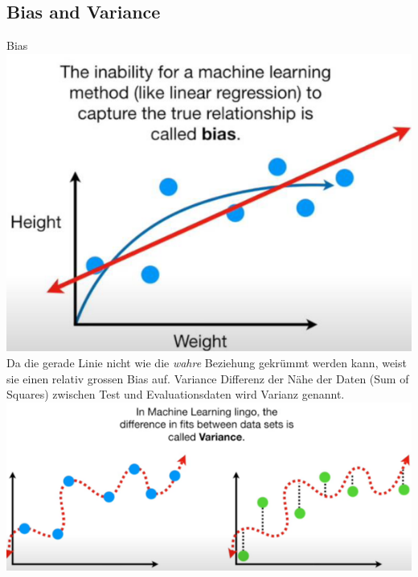 \subsection{Bias and Variance}
\textcolor{myblue}{Bias}\\
\includegraphics[width=\linewidth]{img/bias.png}
Da die gerade Linie nicht wie die \textit{wahre} Beziehung gekrümmt werden kann, weist sie einen relativ grossen Bias auf.
\textcolor{myblue}{Variance}
Differenz der Nähe der Daten (Sum of Squares) zwischen Test und Evaluationsdaten wird Varianz genannt.
\includegraphics[width=\linewidth]{img/variance.png}